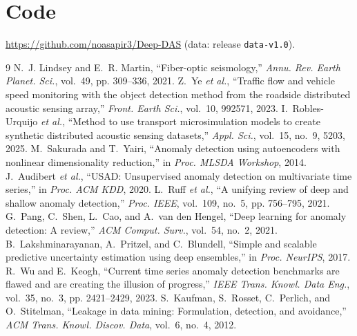 \documentclass[10pt,a4paper,twocolumn]{article}
\begin{document}
\section*{Code}
\url{https://github.com/noasapir3/Deep-DAS} (data: release \texttt{data-v1.0}).

\footnotesize
\begin{thebibliography}{9}\setlength{\itemsep}{0pt}
 N.~J. Lindsey and E.~R. Martin, ``Fiber-optic seismology,'' \emph{Annu. Rev. Earth Planet. Sci.}, vol.~49, pp. 309--336, 2021.
 Z.~Ye \emph{et al.}, ``Traffic flow and vehicle speed monitoring with the object detection method from the roadside distributed acoustic sensing array,'' \emph{Front. Earth Sci.}, vol.~10, 992571, 2023.
 I.~Robles-Urquijo \emph{et al.}, ``Method to use transport microsimulation models to create synthetic distributed acoustic sensing datasets,'' \emph{Appl. Sci.}, vol.~15, no.~9, 5203, 2025.
 M.~Sakurada and T.~Yairi, ``Anomaly detection using autoencoders with nonlinear dimensionality reduction,'' in \emph{Proc. MLSDA Workshop}, 2014.
 J.~Audibert \emph{et al.}, ``USAD: Unsupervised anomaly detection on multivariate time series,'' in \emph{Proc. ACM KDD}, 2020.
 L.~Ruff \emph{et al.}, ``A unifying review of deep and shallow anomaly detection,'' \emph{Proc. IEEE}, vol.~109, no.~5, pp. 756--795, 2021.
 G.~Pang, C.~Shen, L.~Cao, and A.~van den Hengel, ``Deep learning for anomaly detection: A review,'' \emph{ACM Comput. Surv.}, vol.~54, no.~2, 2021.
 B.~Lakshminarayanan, A.~Pritzel, and C.~Blundell, ``Simple and scalable predictive uncertainty estimation using deep ensembles,'' in \emph{Proc. NeurIPS}, 2017.
 R.~Wu and E.~Keogh, ``Current time series anomaly detection benchmarks are flawed and are creating the illusion of progress,'' \emph{IEEE Trans. Knowl. Data Eng.}, vol.~35, no.~3, pp. 2421--2429, 2023.
 S.~Kaufman, S.~Rosset, C.~Perlich, and O.~Stitelman, ``Leakage in data mining: Formulation, detection, and avoidance,'' \emph{ACM Trans. Knowl. Discov. Data}, vol.~6, no.~4, 2012.
\end{thebibliography}
\end{document}
